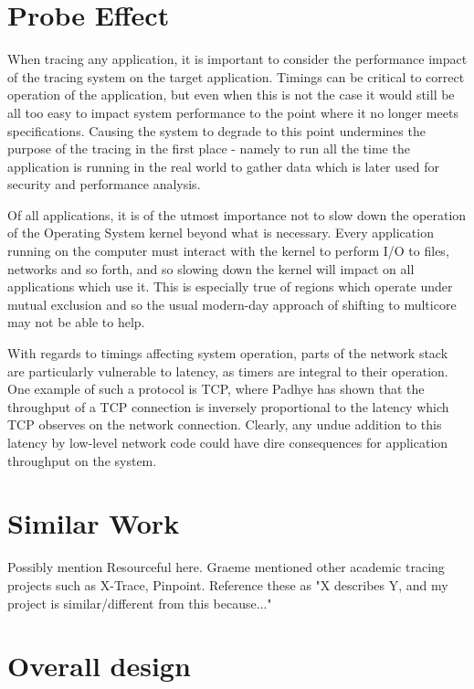 \documentclass[a4paper,12pt,twoside,openright]{report}
\begin{document}
	\section{Probe Effect}	
	When tracing any application, it is important to consider the performance impact of the tracing system on the target application. Timings can be critical to correct operation of the application, but even when this is not the case it would still be all too easy to impact system performance to the point where it no longer meets specifications. Causing the system to degrade to this point undermines the purpose of the tracing in the first place - namely to run all the time the application is running in the real world to gather data which is later used for security and performance analysis.
	
	Of all applications, it is of the utmost importance not to slow down the operation of the Operating System kernel beyond what is necessary. Every application running on the computer must interact with the kernel to perform I/O to files, networks and so forth, and so slowing down the kernel will impact on all applications which use it. This is especially true of regions which operate under mutual exclusion and so the usual modern-day approach of shifting to multicore may not be able to help.
	
	With regards to timings affecting system operation, parts of the network stack are particularly vulnerable to latency, as timers are integral to their operation. One example of such a protocol is TCP, where Padhye\cite{Padhye-TCP} has shown that the throughput of a TCP connection is inversely proportional to the latency which TCP observes on the network connection. Clearly, any undue addition to this latency by low-level network code could have dire consequences for application throughput on the system.
	
	\section{Similar Work}
	
	Possibly mention Resourceful here. Graeme mentioned other academic tracing projects such as X-Trace, Pinpoint. Reference these as "X describes Y, and my project is similar/different from this because..."
	
	\section{Overall design}
	
\end{document}
